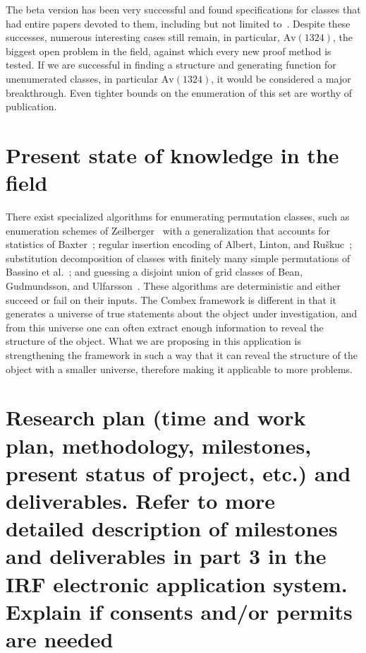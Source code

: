 \documentclass{rannis}
\newcommand{\motheralg}{\textsf{Combex}}
\newcommand{\Av}{\mathrm{Av}}
\theoremstyle{definition}
\begin{document}
The beta version has been very successful and found
specifications for classes that had entire papers devoted to them, including but
not limited to~\cite{inflationsofgridclasses, smoothclasses, le-wilfclasses,
dbis, jaysgridclasses}.
Despite these successes, numerous interesting cases still remain, in particular,
$\Av(1324)$, the biggest open problem in the field, against which every new
proof method is tested.
If we are successful in finding a structure
and generating function for unenumerated classes, in particular
$\Av(1324)$, it would be considered a major breakthrough. Even tighter bounds
on the enumeration of this set are worthy of publication.
\\

\section{Present state of knowledge in the field}
There exist specialized algorithms for enumerating permutation classes, such as
enumeration schemes of \mbox{Zeilberger}~\cite{MR1682929} with a generalization
that accounts for statistics of \mbox{Baxter}~\cite{baxter2014scheme_statistics};
regular insertion encoding of \mbox{Albert}, \mbox{Linton}, and \mbox{Ru\v{s}kuc}~\cite{MR2176523};
substitution decomposition of classes with finitely many simple permutations
of \mbox{Bassino} et al.~\cite{subdecompimplement}; and
guessing a disjoint union of grid classes of Bean, Gudmundsson, and Ulfarsson~\cite{algstruct, structpaper}.
These algorithms are deterministic and either succeed or fail on their inputs.
The \motheralg{} framework is different in that it generates a universe of true
statements about the object under investigation, and from this universe one can
often extract enough information to reveal the structure of the object. What we
are proposing in this application is strengthening the framework in such a way that
it can reveal the structure of the object with a smaller universe, therefore making
it applicable to more problems.
\\

\section{Research plan (time and work plan, methodology, milestones, present status of project, etc.) and deliverables. Refer to more detailed description of milestones and deliverables in part  3 in the IRF electronic application system. Explain if consents and/or permits are needed}
\end{document}
